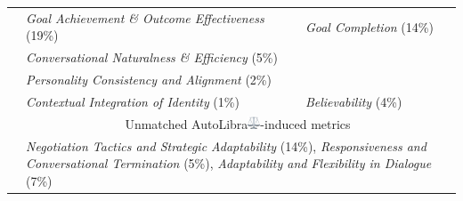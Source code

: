 \begin{table}[!t]
\begin{tabular}{@{}lp{}p{}@{}}
		\cmidrule(lr){2-3}                                                                                & \cellcolor{goal}\textit{Goal Achievement \& Outcome Effectiveness} (19\%)                                                                                                                                                                     & \cellcolor{goal}\textit{Goal Completion} (14\%)                           \\
		                                                                                                  & \cellcolor{believ}\textit{Conversational Naturalness \& Efficiency} (5\%)                                                                                                                                                                     & \cellcolor{believ}                                                        \\
		                                                                                                  & \cellcolor{believ}\textit{Personality Consistency and Alignment} (2\%)                                                                                                                                                                        & \cellcolor{believ}                                                        \\
		                                                                                                  & \cellcolor{believ}\textit{Contextual Integration of Identity} (1\%)                                                                                                                                                                           & \multirow{-3}{*}{\cellcolor{believ}\textit{Believability} (4\%)}          \\
		\cmidrule(lr){2-3}                                                                                & \multicolumn{2}{c}{Unmatched AutoLibra\protect\includegraphics[height=1em]{figs/scale.png}-induced metrics}                                                                                                                                    \\
		\cmidrule(lr){2-3}                                                                                & \multicolumn{2}{C{0.93\textwidth}}{\cellcolor{unmatched}\textit{Negotiation Tactics and Strategic Adaptability} (14\%), \textit{Responsiveness and Conversational Termination} (5\%), \textit{Adaptability and Flexibility in Dialogue} (7\%)} \\

\end{tabular}
\end{table}
